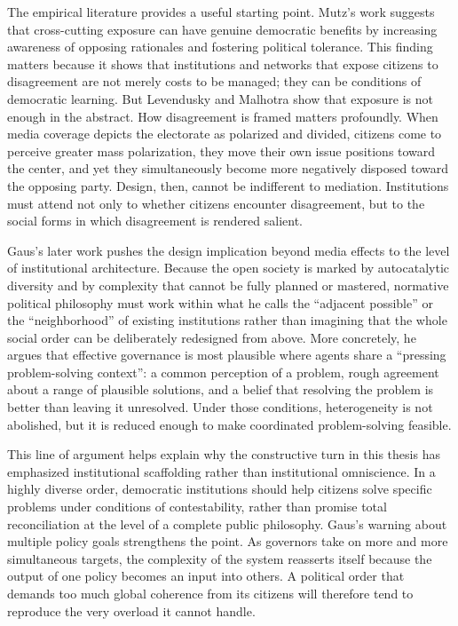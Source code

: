 \documentclass[12pt]{report}
\begin{document}
The empirical literature provides a useful starting point. Mutz's work suggests that cross-cutting exposure can have genuine democratic benefits by increasing awareness of opposing rationales and fostering political tolerance. \parencite[pp.~111--114]{mutz2002crosscutting}
This finding matters because it shows that institutions and networks that expose citizens to disagreement are not merely costs to be managed; they can be conditions of democratic learning. But Levendusky and Malhotra show that exposure is not enough in the abstract. How disagreement is framed matters profoundly. When media coverage depicts the electorate as polarized and divided, citizens come to perceive greater mass polarization, they move their own issue positions toward the center, and yet they simultaneously become more negatively disposed toward the opposing party. \parencite[pp.~283--284, 291--293]{levendusky2016media}
Design, then, cannot be indifferent to mediation. Institutions must attend not only to whether citizens encounter disagreement, but to the social forms in which disagreement is rendered salient.

Gaus's later work pushes the design implication beyond media effects to the level of institutional architecture. Because the open society is marked by autocatalytic diversity and by complexity that cannot be fully planned or mastered, normative political philosophy must work within what he calls the \enquote{adjacent possible} or the \enquote{neighborhood} of existing institutions rather than imagining that the whole social order can be deliberately redesigned from above. \parencite[pp.~14--15]{gaus2021open}
More concretely, he argues that effective governance is most plausible where agents share a \enquote{pressing problem-solving context}: a common perception of a problem, rough agreement about a range of plausible solutions, and a belief that resolving the problem is better than leaving it unresolved. Under those conditions, heterogeneity is not abolished, but it is reduced enough to make coordinated problem-solving feasible. \parencite[pp.~199--200]{gaus2021open}

This line of argument helps explain why the constructive turn in this thesis has emphasized institutional scaffolding rather than institutional omniscience. In a highly diverse order, democratic institutions should help citizens solve specific problems under conditions of contestability, rather than promise total reconciliation at the level of a complete public philosophy. Gaus's warning about multiple policy goals strengthens the point. As governors take on more and more simultaneous targets, the complexity of the system reasserts itself because the output of one policy becomes an input into others. \parencite[p.~218]{gaus2021open}
A political order that demands too much global coherence from its citizens will therefore tend to reproduce the very overload it cannot handle.
\end{document}
